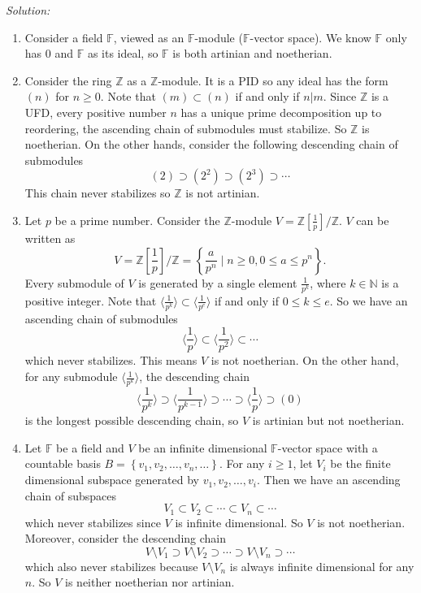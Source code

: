 \documentclass[a4paper, 12pt]{article}
\newenvironment{solution}
    {\textit{Solution:}}
    {}
\newcommand{\la}{\langle}
\newcommand{\ra}{\rangle}
\begin{document}
\begin{solution}
\begin{enumerate}[(1)]
\item Consider a field \(\mathbb{F}\), viewed as an \(\mathbb{F}\)-module (\(\mathbb{F}\)-vector space). We know \(\mathbb{F}\) only has \(0\) and \(\mathbb{F}\) as its ideal,  so \(\mathbb{F}\) is both artinian and noetherian. 
\item Consider the ring \(\mathbb{Z}\) as a \(\mathbb{Z}\)-module. It is a PID so any ideal has the form \((n)\) for \(n\geq 0\). Note that \((m)\subset (n)\) if and only if \(n|m\). Since \(\mathbb{Z}\) is a UFD, every positive number \(n\) has 
a unique prime decomposition up to reordering, the ascending chain of submodules must stabilize. So \(\mathbb{Z}\) is noetherian. On the other hands, consider the following descending chain of submodules 
\[(2)\supset (2^2)\supset (2^3)\supset \cdots\]
This chain never stabilizes so \(\mathbb{Z}\) is not artinian. 
\item Let \(p\) be a prime number. Consider the \(\mathbb{Z}\)-module \(V=\mathbb{Z}[\frac{1}{p}]/\mathbb{Z}\). \(V\) can be written as 
\[V=\mathbb{Z}[\frac{1}{p}]/\mathbb{Z}=\left\{ \frac{a}{p^n}\mid n\geq 0, 0\leq a\leq p^n\right\}.\]
Every submodule of \(V\) is generated by a single element \(\frac{1}{p^k}\), where \(k\in \mathbb{N}\) is a positive integer. Note that \(\la \frac{1}{p^k}\ra\subset \la \frac{1}{p^e}\ra\) if and only if \(0\leq k\leq e\). So we have an ascending chain of submodules 
\[\la \frac{1}{p}\ra\subset \la \frac{1}{p^2}\ra\subset \cdots\]
which never stabilizes. This means \(V\) is not noetherian. On the other hand, for any submodule \(\la \frac{1}{p^k}\ra\), the descending chain 
\[\la \frac{1}{p^k}\ra \supset \la \frac{1}{p^{k-1}}\ra\supset \cdots \supset \la \frac{1}{p}\ra\supset (0)\]
is the longest possible descending chain, so \(V\) is artinian but not noetherian.
\item Let \(\mathbb{F}\) be a field and \(V\) be an infinite dimensional \(\mathbb{F}\)-vector space with a countable basis \(B=\left\{ v_1,v_2,\ldots,v_n,\ldots \right\}\). For any \(i\geq 1\), let \(V_i\) be the 
finite dimensional subspace generated by \(v_1,v_2,\ldots,v_i\). Then we have an ascending chain of subspaces 
\[V_1\subset V_2\subset \cdots\subset V_n\subset\cdots\]
which never stabilizes since \(V\) is infinite dimensional. So \(V\) is not noetherian. Moreover, consider the descending chain 
\[V\setminus V_1\supset V\setminus V_2\supset \cdots\supset V\setminus V_n\supset \cdots\]
which also never stabilizes because \(V\setminus V_n\) is always infinite dimensional for any \(n\). So \(V\) is neither noetherian nor artinian.
\end{enumerate}
\end{solution}
\end{document}
